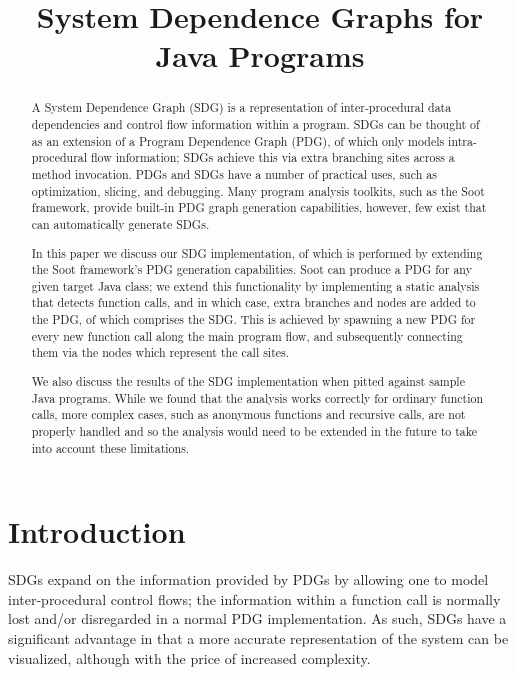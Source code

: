 \documentclass[authoryear,preprint]{sigplanconf}
\begin{document}
\setlength{\pdfpageheight}{\paperheight}
\setlength{\pdfpagewidth}{\paperwidth}


\title{System Dependence Graphs for Java Programs}


\maketitle

\begin{abstract}
A System Dependence Graph (SDG) is a representation of inter-procedural data dependencies and control flow information within a program. SDGs can be thought of as an extension of a Program Dependence Graph (PDG), of which only models intra-procedural flow information; SDGs achieve this via extra branching sites across a method invocation. PDGs and SDGs have a number of practical uses, such as optimization, slicing, and debugging. Many program analysis toolkits, such as the Soot framework, provide built-in PDG graph generation capabilities, however, few exist that can automatically generate SDGs.    

In this paper we discuss our SDG implementation, of which is performed by extending the Soot framework's PDG generation capabilities. Soot can produce a PDG for any given target Java class; we extend this functionality by implementing a static analysis that detects function calls, and in which case, extra branches and nodes are added to the PDG, of which comprises the SDG. This is achieved by spawning a new PDG for every new function call along the main program flow, and subsequently connecting them via the nodes which represent the call sites.

We also discuss the results of the SDG implementation when pitted against sample Java programs. While we found that the analysis works correctly for ordinary function calls, more complex cases, such as anonymous functions and recursive calls, are not properly handled and so the analysis would need to be extended in the future to take into account these limitations.  
\end{abstract}


\section{Introduction}
\label{sec:introduction}

SDGs expand on the information provided by PDGs by allowing one to model inter-procedural control flows; the information within a function call is normally lost and/or disregarded in a normal PDG implementation. As such, SDGs have a significant advantage in that a more accurate representation of the system can be visualized, although with the price of increased complexity. 
\end{document}
